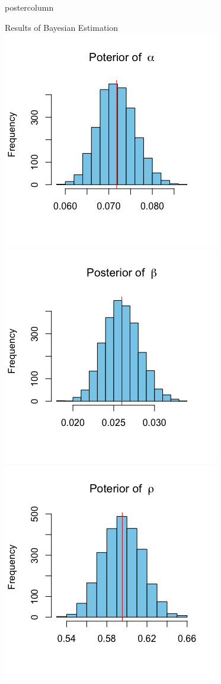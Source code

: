 \documentclass[final]{beamer}\usepackage[]{graphicx}\usepackage[]{color}
\begin{document}
{\begin{frame}
\begin{columns}
\begin{column}{.33\textwidth}
\begin{beamercolorbox}[center,wd=\textwidth]{postercolumn}
\begin{minipage}[T]{.97\textwidth}
{\begin{block}{Results of Bayesian Estimation}
  \includegraphics[scale=0.8]{P of a.png}
  \includegraphics[scale=0.8]{P of b.png}
  \includegraphics[scale=0.8]{P of p.png}


\end{block}}
\end{minipage}
\end{beamercolorbox}
\end{column}
\end{columns}
\end{frame}}
\end{document}
